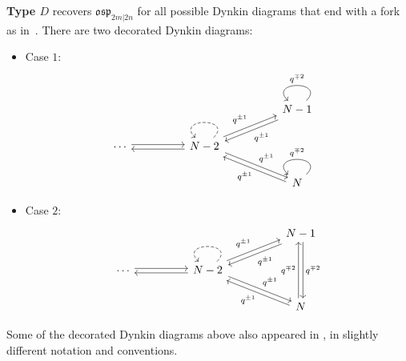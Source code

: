 \documentclass{amsart}
\def\fosp{\mathfrak{osp}}
\begin{document}
\medskip 

\noindent \textbf{Type $D$} recovers $\fosp_{2m|2n}$ for all possible Dynkin diagrams that end with a fork as in~\cite[\S 3.1, diagrams ($D_N$)]{Y1}. There are two decorated Dynkin diagrams:

\medskip 


\begin{itemize}[leftmargin=*]

\item Case $1$: 
\begin{equation}
\label{eqn:dynkin d 1}
\begin{tikzcd}
&&&& {N-1} \\
\cdots && {N-2} \\
&&&& N
\arrow[shift left=2pt, from=2-1, to=2-3]
\arrow[shift left=2pt, from=2-3, to=2-1]
\arrow["q^{\pm 1}", shift left=2pt, from=2-3, to=1-5]
\arrow["q^{\pm 1}", shift left=2pt, from=1-5, to=2-3]
\arrow["q^{\pm 1}", shift left=2pt, from=2-3, to=3-5]
\arrow["q^{\pm 1}", shift left=2pt, from=3-5, to=2-3]
\arrow["q^{\mp 2}", swap, from=1-5, to=1-5, looseness=4]
\arrow["q^{\mp 2}", swap, from=3-5, to=3-5, looseness=4]
\arrow[dashed, from=2-3, to=2-3, looseness=4]
\end{tikzcd}
\end{equation}

\medskip 

\item Case $2$: 
\begin{equation}
\label{eqn:dynkin d 2}
\begin{tikzcd}
&&&& {N-1} \\
\cdots && {N-2} \\
&&&& N
\arrow[shift left=2pt, from=2-1, to=2-3]
\arrow[shift left=2pt, from=2-3, to=2-1]
\arrow["q^{\pm 1}", shift left=2pt, from=2-3, to=1-5]
\arrow["q^{\pm 1}", shift left=2pt, from=1-5, to=2-3]
\arrow["q^{\pm 1}", shift left=2pt, from=2-3, to=3-5]
\arrow["q^{\pm 1}", shift left=2pt, from=3-5, to=2-3]
\arrow["{q^{\mp 2}}", shift left=2pt, from=1-5, to=3-5]
\arrow["{q^{\mp 2}}", shift left=2pt, from=3-5, to=1-5]
\arrow[dashed, from=2-3, to=2-3, looseness=4]
\end{tikzcd}
\end{equation}

\end{itemize}

\medskip 

\noindent Some of the decorated Dynkin diagrams above also appeared in \cite{Bao}, in slightly different notation and conventions.
\end{document}
